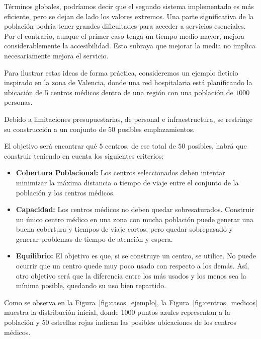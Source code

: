 \documentclass[12pt,a4paper]{book}
\begin{document}
Términos globales, podríamos decir que el segundo sistema implementado es más eficiente, pero se dejan de lado los valores extremos.
Una parte significativa de la población podría tener grandes dificultades para acceder a servicios esenciales.
Por el contrario, aunque el primer caso tenga un tiempo medio mayor, mejora considerablemente la accesibilidad. Esto subraya que mejorar la media no implica necesariamente mejora el servicio.
\newpage

Para ilustrar estas ideas de forma práctica, consideremos un ejemplo ficticio inspirado en la zona de Valencia, donde una red hospitalaria está
planificando la ubicación de 5 centros médicos dentro de una región con una población de $1000$ personas. 

Debido a limitaciones presupuestarias, de personal e infraestructura, se restringe su construcción a un conjunto de $50$ posibles emplazamientos. 

El objetivo será encontrar qué $5$ centros, de ese total de $50$ posibles, habrá que construir teniendo en cuenta los siguientes criterios:

\begin{itemize}
    \item \textbf{Cobertura Poblacional:} Los centros seleccionados deben intentar minimizar la máxima distancia o tiempo de viaje entre el conjunto de la población y los centros médicos.
    \item \textbf{Capacidad:} Los centros médicos no deben quedar sobresaturados. Construir un único centro médico en una zona con mucha población puede generar una buena cobertura y tiempos de viaje cortos, pero quedar sobrepasado y generar problemas de tiempo de atención y espera.
    \item \textbf{Equilibrio:} El objetivo es que, si se construye un centro, se utilice. No puede ocurrir que un centro quede muy poco usado con respecto a los demás. Así, otro objetivo será que la diferencia entre los más usados y los menos sea la mínima posible, quedando su uso bien repartido.
\end{itemize}


Como se observa en la Figura~\ref{fig:casos_ejemplo}, la Figura~\ref{fig:centros_medicos} muestra la distribución inicial, donde 1000 puntos azules representan a la población y 50 estrellas rojas indican las posibles ubicaciones de los centros médicos.
\end{document}
